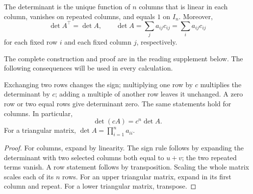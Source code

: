 \begin{theorem}\label{thm:07:laws}
The determinant is the unique function of \(n\) columns that is linear in
each column, vanishes on repeated columns, and equals \(1\) on \(I_n\).
Moreover,
\[
 \det A^\top=\det A,\qquad
 \det A=\sum_j a_{ij}c_{ij}=\sum_i a_{ij}c_{ij}
\]
for each fixed row \(i\) and each fixed column \(j\), respectively.
\end{theorem}
The complete construction and proof are in the reading supplement below.
The following consequences will be used in every calculation.

\begin{proposition}
Exchanging two rows changes the sign; multiplying one row by \(c\) multiplies
the determinant by \(c\); adding a multiple of another row leaves it
unchanged. A zero row or two equal rows give determinant zero.
The same statements hold for columns. In particular,
\[
 \det(cA)=c^n\det A.
\]
For a triangular matrix, \(\det A=\prod_{i=1}^n a_{ii}\).
\end{proposition}
\begin{proof}
For columns, expand by linearity. The sign rule follows by expanding the
determinant with two selected columns both equal to \(u+v\); the two repeated
terms vanish. A row statement follows by transposition. Scaling the whole
matrix scales each of its \(n\) rows. For an upper triangular matrix, expand
in its first column and repeat. For a lower triangular matrix, transpose.
\end{proof}


